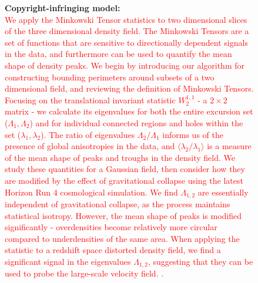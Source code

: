 \begin{figure}[!htbp]
    \begin{mdframed}[
        backgroundcolor=lightgray,
        linewidth=2pt,
        linecolor=lightblue,
        frametitle={\textbf{Prompt:} Minkowski Tensors in Two Dimensions - Probing the Morphology and Isotropy of the Matter and Galaxy Density Fields
},
        frametitlebackgroundcolor=lightblue!20,
        roundcorner=10pt,
        innerleftmargin=10pt,
        innerrightmargin=10pt,
        innertopmargin=10pt,
        innerbottommargin=10pt
    ]
    \raggedright
    \begin{minipage}[t]{\textwidth}
        \textbf{Copyright-infringing model:} \\
        \textcolor{red}{We apply the Minkowski Tensor statistics to two dimensional slices of the three dimensional density field. The Minkowski Tensors are a set of functions that are sensitive to directionally dependent signals in the data, and furthermore can be used to quantify the mean shape of density peaks. We begin by introducing our algorithm for constructing bounding perimeters around subsets of a two dimensional field, and reviewing the definition of Minkowski Tensors. Focusing on the translational invariant statistic $W^{1,1}_{2}$ - a $2 \times 2$ matrix - we calculate its eigenvalues for both the entire excursion set ($\Lambda_{1},\Lambda_{2}$) and for individual connected regions and holes within the set ($\lambda_{1},\lambda_{2}$). The ratio of eigenvalues $\Lambda_{2}/\Lambda_{1}$ informs us of the presence of global anisotropies in the data, and $\langle \lambda_{2}/\lambda_{1} \rangle$ is a measure of the mean shape of peaks and troughs in the density field. We study these quantities for a Gaussian field, then consider how they are modified by the effect of gravitational collapse using the latest Horizon Run 4 cosmological simulation. We find $\Lambda_{1,2}$ are essentially independent of gravitational collapse, as the process maintains statistical isotropy. However, the mean shape of peaks is modified significantly - overdensities become relatively more circular compared to underdensities of the same area. When applying the statistic to a redshift space distorted density field, we find a significant signal in the eigenvalues $\Lambda_{1,2}$, suggesting that they can be used to probe the large-scale velocity field.
.} \\
    \end{minipage}
    \vspace{10pt}
    \begin{minipage}[t]{\textwidth}

\end{minipage}
\end{mdframed}
\end{figure}
